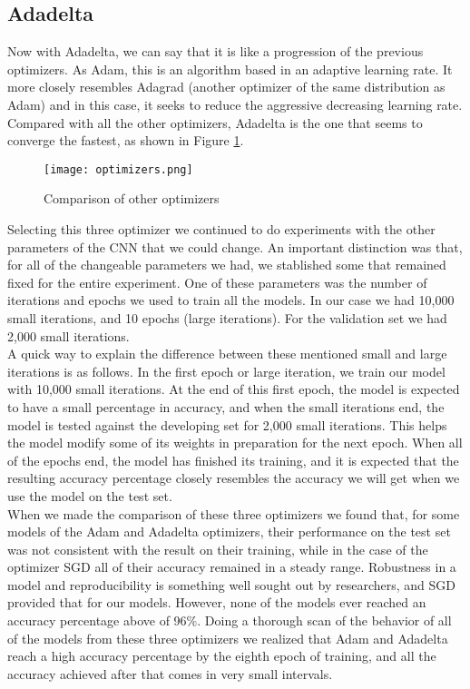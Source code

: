 \documentclass[review]{elsarticle}
\begin{document}
\subsection{Adadelta}

Now with Adadelta, we can say that it is like a progression of the previous optimizers. As Adam, this is an algorithm based in an adaptive learning rate. It more closely resembles Adagrad (another optimizer of the same distribution as Adam) and in this case, it seeks to reduce the aggressive decreasing learning rate. Compared with all the other optimizers, Adadelta is the one that seems to converge the fastest, as shown in Figure \ref{fig1}.\\


\begin{figure}[]
  \centering
  \texttt{[image: optimizers.png]}  
	\caption{Comparison of other optimizers \cite{opti}}
\label{fig1}
\end{figure}

Selecting this three optimizer we continued to do experiments with the other parameters of the CNN that we could change. An important distinction was that, for all of the changeable parameters we had, we stablished some that remained fixed for the entire experiment. One of these parameters was the number of iterations and epochs we used to train all the models. In our case we had 10,000 small iterations, and 10 epochs (large iterations). For the validation set we had 2,000 small iterations. \\

A quick way to explain the difference between these mentioned small and large iterations is as follows. In the first epoch or large iteration, we train our model with 10,000 small iterations. At the end of this first epoch, the model is expected to have a small percentage in accuracy, and when the small iterations end, the model is tested against the developing set for 2,000 small iterations. This helps the model modify some of its weights in preparation for the next epoch. When all of the epochs end, the model has finished its training, and it is expected that the resulting accuracy percentage closely resembles the accuracy we will get when we use the model on the test set.\\

When we made the comparison of these three optimizers we found that, for some models of the Adam and Adadelta optimizers, their performance on the test set was not consistent with the result on their training, while in the case of the optimizer SGD all of their accuracy remained in a steady range. Robustness in a model and reproducibility is something well sought out by researchers, and SGD provided that for our models. However, none of the models ever reached an accuracy percentage above of 96\%. Doing a thorough scan of the behavior of all of the models from these three optimizers we realized that Adam and Adadelta reach a high accuracy percentage by the eighth epoch of training, and all the accuracy achieved after that comes in very small intervals.\\
\end{document}
